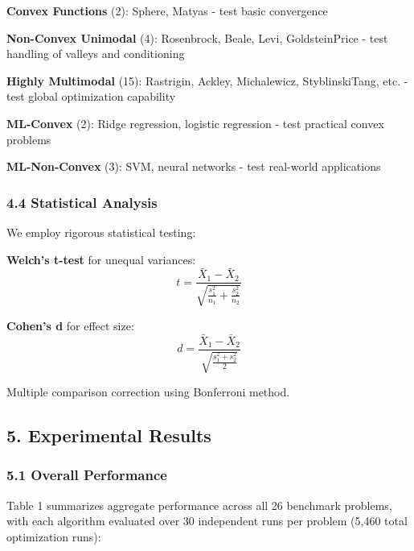 \textbf{Convex Functions} (2): Sphere, Matyas - test basic convergence

\textbf{Non-Convex Unimodal} (4): Rosenbrock, Beale, Levi, GoldsteinPrice - test handling of valleys and conditioning

\textbf{Highly Multimodal} (15): Rastrigin, Ackley, Michalewicz, StyblinskiTang, etc. - test global optimization capability

\textbf{ML-Convex} (2): Ridge regression, logistic regression - test practical convex problems

\textbf{ML-Non-Convex} (3): SVM, neural networks - test real-world applications

\hypertarget{statistical-analysis}{%
\subsubsection{4.4 Statistical Analysis}\label{statistical-analysis}}

We employ rigorous statistical testing:

\textbf{Welch's t-test} for unequal variances:
\[t = \frac{\bar{X}_1 - \bar{X}_2}{\sqrt{\frac{s_1^2}{n_1} + \frac{s_2^2}{n_2}}}\]

\textbf{Cohen's d} for effect size:
\[d = \frac{\bar{X}_1 - \bar{X}_2}{\sqrt{\frac{s_1^2 + s_2^2}{2}}}\]

Multiple comparison correction using Bonferroni method.

\hypertarget{experimental-results}{%
\subsection{5. Experimental Results}\label{experimental-results}}

\hypertarget{overall-performance}{%
\subsubsection{5.1 Overall Performance}\label{overall-performance}}

Table 1 summarizes aggregate performance across all 26 benchmark problems, with each algorithm evaluated over 30
independent runs per problem (5,460 total optimization runs):

